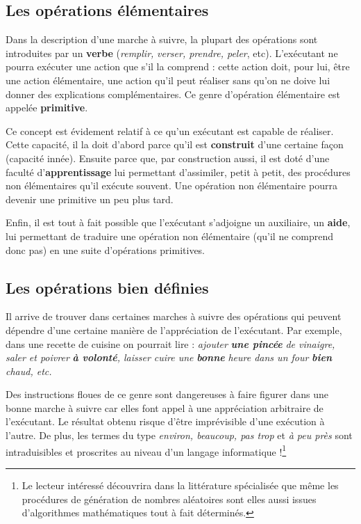 	\subsection{Les opérations élémentaires}


		Dans la description d’une marche à suivre, la plupart des opérations
		sont introduites par un \textbf{verbe
		}(\textit{remplir,}\textbf{\textit{ }}\textit{verser, prendre, peler},
		etc). L’exécutant ne pourra exécuter une action que s’il la comprend :
		cette action doit, pour lui, être une action élémentaire, une action
		qu’il peut réaliser sans qu’on ne doive lui donner des explications
		complémentaires. Ce genre d’opération élémentaire est appelée
		\textbf{primitive}.
		
		Ce concept est évidement relatif à ce qu’un exécutant est capable de
		réaliser. Cette capacité, il la doit d’abord parce qu’il est
		\textbf{construit} d’une certaine façon (capacité innée). Ensuite parce
		que, par construction aussi, il est doté d’une faculté
		d’\textbf{apprentissage} lui permettant d’assimiler, petit à petit, des
		procédures non élémentaires qu’il exécute souvent. Une opération non
		élémentaire pourra devenir une primitive un peu plus tard.
		
		Enfin, il est tout à fait possible que l’exécutant s’adjoigne un
		auxiliaire, un \textbf{aide}, lui permettant de traduire une opération
		non élémentaire (qu’il ne comprend donc pas) en une suite d’opérations
		primitives.

	\subsection{Les opérations bien définies}

		Il arrive de trouver dans certaines marches à suivre des opérations qui
		peuvent dépendre d’une certaine manière de l’appréciation de
		l’exécutant. Par exemple, dans une recette de cuisine on pourrait lire
		: \textit{ajouter }\textbf{\textit{une pincée }}\textit{de vinaigre,
		saler et poivrer }\textbf{\textit{à volonté}}\textit{, laisser cuire
		une }\textbf{\textit{bonne}}\textit{ heure dans un four
		}\textbf{\textit{bien}}\textit{ chaud, etc.}
		
		Des instructions floues de ce genre sont dangereuses à faire figurer
		dans une bonne marche à suivre car elles font appel à une appréciation
		arbitraire de l'exécutant. Le résultat obtenu risque
		d’être imprévisible d’une exécution à l’autre. De plus, les termes du
		type \textit{environ, beaucoup, pas trop} et \textit{à peu près }sont
		intraduisibles et proscrites au niveau d’un langage informatique
		!\footnote{Le lecteur intéressé découvrira dans la littérature
		spécialisée que même les procédures de génération de nombres aléatoires
		sont elles aussi issues d’algorithmes mathématiques tout à fait
		déterminés.}
		
